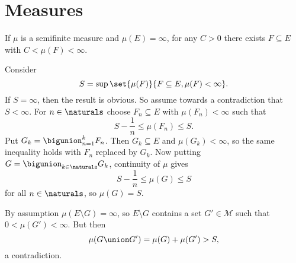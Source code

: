 \documentclass[article, a4paper, 11pt, oneside]{memoir}
\numberwithin{equation}{chapter}
\newcommand{\calM}{\mathcal{M}}
\begin{document}



\section{Measures}

\begin{exerciseframed*}[14]
    If $\mu$ is a semifinite measure and $\mu(E) = \infty$, for any $C > 0$ there exists $F \subseteq E$ with $C < \mu(F) < \infty$.
\end{exerciseframed*}
%
Consider
%
\begin{equation*}
	S = \sup \set{ \mu(F) }{ F \subseteq E, \mu(F) < \infty }.
\end{equation*}
%
If $S = \infty$, then the result is obvious. So assume towards a contradiction that $S < \infty$. For $n \in \naturals$ choose $F_n \subseteq E$ with $\mu(F_n) < \infty$ such that
%
\begin{equation*}
	S - \frac{1}{n} \leq \mu(F_n) \leq S.
\end{equation*}
%
Put $G_k = \bigunion_{n=1}^k F_n$. Then $G_k \subseteq E$ and $\mu(G_k) < \infty$, so the same inequality holds with $F_n$ replaced by $G_k$. Now putting $G = \bigunion_{k \in \naturals} G_k$, continuity of $\mu$ gives
%
\begin{equation*}
	S - \frac{1}{n} \leq \mu(G) \leq S
\end{equation*}
%
for all $n \in \naturals$, so $\mu(G) = S$.

By assumption $\mu(E \setminus G) = \infty$, so $E \setminus G$ contains a set $G' \in \calM$ such that $0 < \mu(G') < \infty$. But then
%
\begin{equation*}
	\mu(G \union G') = \mu(G) + \mu(G') > S,
\end{equation*}
%
a contradiction.
\end{document}
